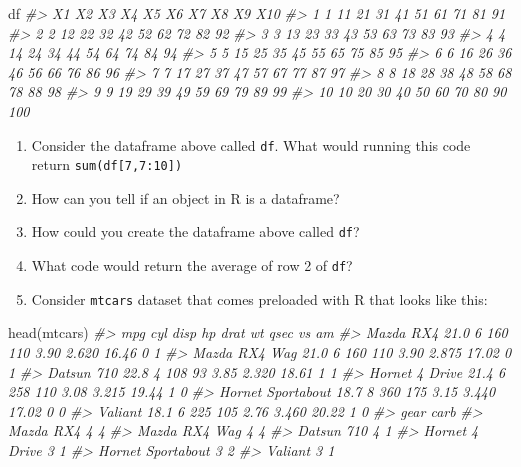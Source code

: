 \documentclass[
]{book}
\newenvironment{Shaded}{\begin{snugshade}}{\end{snugshade}}
\newcommand{\CommentTok}[1]{\textcolor[rgb]{0.56,0.35,0.01}{\textit{#1}}}
\newcommand{\FunctionTok}[1]{\textcolor[rgb]{0.00,0.00,0.00}{#1}}
\newcommand{\NormalTok}[1]{#1}
\begin{document}
\begin{Shaded}
\begin{Highlighting}[]
\NormalTok{df}
\CommentTok{\#\textgreater{}    X1 X2 X3 X4 X5 X6 X7 X8 X9 X10}
\CommentTok{\#\textgreater{} 1   1 11 21 31 41 51 61 71 81  91}
\CommentTok{\#\textgreater{} 2   2 12 22 32 42 52 62 72 82  92}
\CommentTok{\#\textgreater{} 3   3 13 23 33 43 53 63 73 83  93}
\CommentTok{\#\textgreater{} 4   4 14 24 34 44 54 64 74 84  94}
\CommentTok{\#\textgreater{} 5   5 15 25 35 45 55 65 75 85  95}
\CommentTok{\#\textgreater{} 6   6 16 26 36 46 56 66 76 86  96}
\CommentTok{\#\textgreater{} 7   7 17 27 37 47 57 67 77 87  97}
\CommentTok{\#\textgreater{} 8   8 18 28 38 48 58 68 78 88  98}
\CommentTok{\#\textgreater{} 9   9 19 29 39 49 59 69 79 89  99}
\CommentTok{\#\textgreater{} 10 10 20 30 40 50 60 70 80 90 100}
\end{Highlighting}
\end{Shaded}

\begin{enumerate}
\def\labelenumi{\arabic{enumi}.}
\item
  Consider the dataframe above called \texttt{df}. What would running this code return \texttt{sum(df{[}7,7:10{]})}
\item
  How can you tell if an object in R is a dataframe?
\item
  How could you create the dataframe above called \texttt{df}?
\item
  What code would return the average of row 2 of \texttt{df}?
\item
  Consider \texttt{mtcars} dataset that comes preloaded with R that looks like this:
\end{enumerate}

\begin{Shaded}
\begin{Highlighting}[]
\FunctionTok{head}\NormalTok{(mtcars)}
\CommentTok{\#\textgreater{}                    mpg cyl disp  hp drat    wt  qsec vs am}
\CommentTok{\#\textgreater{} Mazda RX4         21.0   6  160 110 3.90 2.620 16.46  0  1}
\CommentTok{\#\textgreater{} Mazda RX4 Wag     21.0   6  160 110 3.90 2.875 17.02  0  1}
\CommentTok{\#\textgreater{} Datsun 710        22.8   4  108  93 3.85 2.320 18.61  1  1}
\CommentTok{\#\textgreater{} Hornet 4 Drive    21.4   6  258 110 3.08 3.215 19.44  1  0}
\CommentTok{\#\textgreater{} Hornet Sportabout 18.7   8  360 175 3.15 3.440 17.02  0  0}
\CommentTok{\#\textgreater{} Valiant           18.1   6  225 105 2.76 3.460 20.22  1  0}
\CommentTok{\#\textgreater{}                   gear carb}
\CommentTok{\#\textgreater{} Mazda RX4            4    4}
\CommentTok{\#\textgreater{} Mazda RX4 Wag        4    4}
\CommentTok{\#\textgreater{} Datsun 710           4    1}
\CommentTok{\#\textgreater{} Hornet 4 Drive       3    1}
\CommentTok{\#\textgreater{} Hornet Sportabout    3    2}
\CommentTok{\#\textgreater{} Valiant              3    1}
\end{Highlighting}
\end{Shaded}
\end{document}
